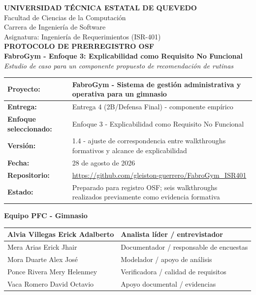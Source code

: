 \documentclass[9pt,a4paper]{extarticle}
\author{}
\date{}
\begin{document}
\thispagestyle{empty}
\begin{center}
{\Large\bfseries UNIVERSIDAD TÉCNICA ESTATAL DE QUEVEDO}\\[6pt]
{\normalsize Facultad de Ciencias de la Computación}\\[3pt]
{\normalsize Carrera de Ingeniería de Software}\\[14pt]
{\normalsize Asignatura: Ingeniería de Requerimientos (ISR-401)}\\[18pt]

{\LARGE\bfseries PROTOCOLO DE PRERREGISTRO OSF}\\[8pt]
{\large\bfseries FabroGym - Enfoque 3: Explicabilidad como Requisito No Funcional}\\[5pt]
{\normalsize\itshape Estudio de caso para un componente propuesto de recomendación de rutinas}\\[14pt]
\end{center}

\begin{center}
\begin{tabular}{|>{\bfseries}p{}|p{}|}
\hline
Proyecto: & FabroGym - Sistema de gestión administrativa y operativa para un gimnasio \\ \hline
Entrega: & Entrega 4 (2B/Defensa Final) - componente empírico \\ \hline
Enfoque seleccionado: & Enfoque 3 - Explicabilidad como Requisito No Funcional \\ \hline
Versión: & 1.4 - ajuste de correspondencia entre walkthroughs formativos y alcance de explicabilidad \\ \hline
Fecha: & 28 de agosto de 2026 \\ \hline
Repositorio: & \url{https://github.com/gleiston-guerrero/FabroGym_ISR401} \\ \hline
Estado: & Preparado para registro OSF; seis walkthroughs realizados previamente como evidencia formativa \\ \hline
\end{tabular}
\end{center}

\vspace{8pt}
\begin{center}
{\bfseries Equipo PFC - Gimnasio}\\[5pt]
\begin{tabular}{|p{}|p{}|}
\hline
Alvia Villegas Erick Adalberto & Analista líder / entrevistador \\ \hline
Mera Arias Erick Jhair & Documentador / responsable de encuestas \\ \hline
Mora Duarte Alex José & Modelador / apoyo de análisis \\ \hline
Ponce Rivera Mery Helenmey & Verificadora / calidad de requisitos \\ \hline
Vaca Romero David Octavio & Apoyo documental / evidencias \\ \hline
\end{tabular}
\end{center}
\end{document}
